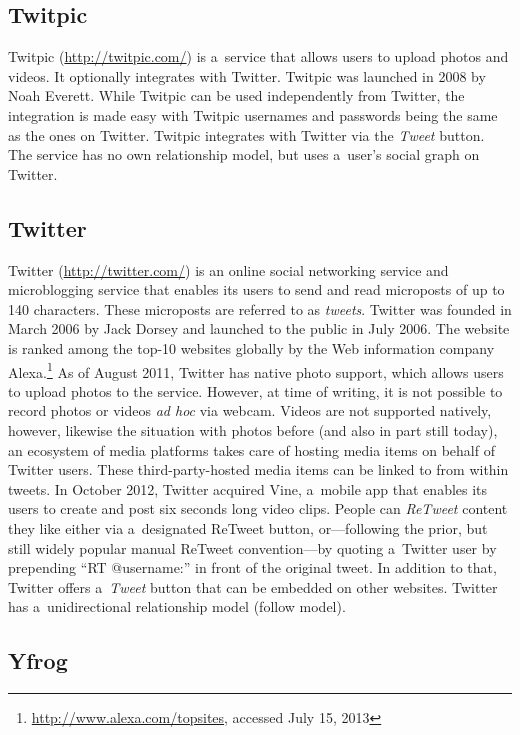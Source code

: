 \subsection{Twitpic}

Twitpic (\url{http://twitpic.com/})
is a~service that allows users to upload photos and videos.
It optionally integrates with Twitter.
Twitpic was launched in 2008 by Noah Everett.
While Twitpic can be used independently from Twitter,
the integration is made easy with Twitpic usernames and passwords
being the same as the ones on Twitter.
Twitpic integrates with Twitter via the \emph{Tweet} button.
The service has no own relationship model,
but uses a~user's social graph on Twitter.

\subsection{Twitter}
\label{sec:twitter}

Twitter (\url{http://twitter.com/})
is an online social networking service
and microblogging service
that enables its users to send and read microposts
of up to 140 characters.
These microposts are referred to as \emph{tweets}.
Twitter was founded in March 2006 by Jack Dorsey
and launched to the public in July 2006.
The website is ranked among the top-10 websites globally
by the Web information company
Alexa.\footnote{\url{http://www.alexa.com/topsites},
accessed July 15, 2013}
As of August 2011, Twitter has native photo support,
which allows users to upload photos to the service.
However, at time of writing, it is not possible to 
record photos or videos \emph{ad hoc} via webcam.
Videos are not supported natively, however,
likewise the situation with photos before
(and also in part still today),
an ecosystem of media platforms takes care of
hosting media items on behalf of Twitter users.
These third-party-hosted media items
can be linked to from within tweets.
In October 2012, Twitter acquired Vine,
a~mobile app that enables its users to create
and post six seconds long video clips.
People can \emph{ReTweet} content they like either
via a~designated ReTweet button,
or---following the prior, but still widely popular
manual ReTweet convention---by
quoting a~Twitter user by prepending ``RT @username:''
in front of the original tweet.
In addition to that, Twitter offers
a~\emph{Tweet} button that can be embedded on other websites.
Twitter has a~unidirectional relationship model (follow model).

\subsection{Yfrog}

